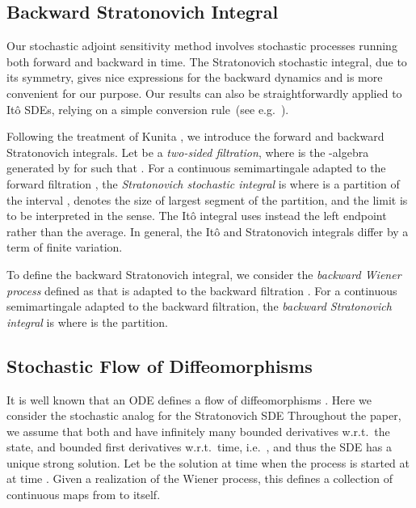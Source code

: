 \documentclass[twoside]{article}
\begin{document}
\subsection{Backward Stratonovich Integral}
\label{subsec:bg_backward_stratonovich_integral}
Our stochastic adjoint sensitivity method involves stochastic processes running both forward and backward in time. The Stratonovich stochastic integral, due to its symmetry, gives nice expressions for the backward dynamics and is more convenient for our purpose.
Our results can also be straightforwardly applied to It\^o SDEs, relying on a simple conversion rule~(see e.g.~\cite[Sec. 2]{platen1999introduction}).

Following the treatment of Kunita \cite{kunita2019stochastic}, we introduce the forward and backward Stratonovich integrals. Let  be a \emph{two-sided filtration}, where  is the -algebra generated by  for  such that . For a continuous semimartingale  adapted to the forward filtration , the \emph{Stratonovich stochastic integral} is
where  is a partition of the interval ,  denotes the size of largest segment of the partition, and the limit is to be interpreted in the  sense. The It\^{o} integral uses instead the left endpoint  rather than the average. In general, the It\^{o} and Stratonovich integrals differ by a term of finite variation.

To define the backward Stratonovich integral, we consider the \emph{backward Wiener process}  defined as  that is adapted to the backward filtration . For a continuous semimartingale  adapted to the backward filtration, the \emph{backward Stratonovich integral} is
where  is the partition. 

\subsection{Stochastic Flow of Diffeomorphisms}
\label{subsec:bg_stochastic_flow}
It is well known that an ODE defines a flow of diffeomorphisms \cite{arnold1978ordinary}. Here we consider the stochastic analog for the Stratonovich SDE
Throughout the paper, we assume that both  and  have infinitely many bounded derivatives w.r.t.\ the state, and bounded first derivatives w.r.t.\ time, i.e.\ , and thus the SDE has a unique strong solution.
 Let  be the solution at time  when the process is started at  at time . 
Given a realization of the Wiener process, this defines a collection of continuous maps  from  to itself. 
\end{document}
